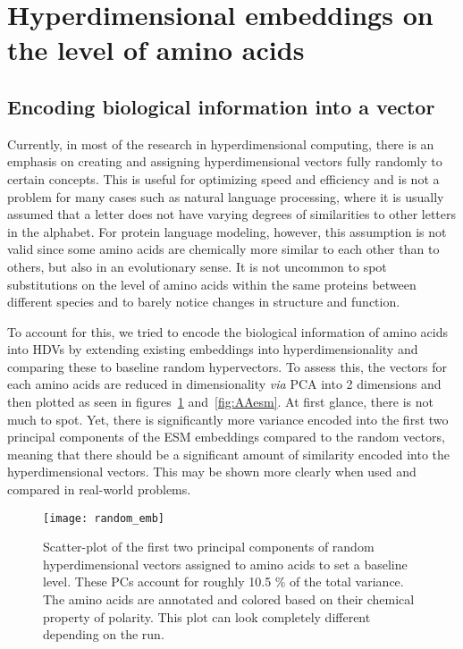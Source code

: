 \section{Hyperdimensional embeddings on the level of amino acids}
\subsection*{Encoding biological information into a vector}
Currently, in most of the research in hyperdimensional computing, there is an emphasis on creating and assigning hyperdimensional vectors fully randomly to certain concepts. This is useful for optimizing speed and efficiency and is not a problem for many cases such as natural language processing, where it is usually assumed that a letter does not have varying degrees of similarities to other letters in the alphabet. For protein language modeling, however, this assumption is not valid since some amino acids are chemically more similar to each other than to others, but also in an evolutionary sense. It is not uncommon to spot substitutions on the level of amino acids within the same proteins between different species and to barely notice changes in structure and function.

To account for this, we tried to encode the biological information of amino acids into HDVs by extending existing embeddings into hyperdimensionality and comparing these to baseline random hypervectors. To assess this, the vectors for each amino acids are reduced in dimensionality \textit{via} PCA into 2 dimensions and then plotted as seen in figures~\ref{fig:AArand} and~\ref{fig:AAesm}. At first glance, there is not much to spot. Yet, there is significantly more variance encoded into the first two principal components of the ESM embeddings compared to the random vectors, meaning that there should be a significant amount of similarity encoded into the hyperdimensional vectors. This may be shown more clearly when used and compared in real-world problems.
\begin{figure}[H]
    \centering
    \texttt{[image: random\_emb]}
    \caption{Scatter-plot of the first two principal components of random hyperdimensional vectors assigned to amino acids to set a baseline level. These PCs account for roughly 10.5 \% of the total variance. The amino acids are annotated and colored based on their chemical property of polarity. This plot can look completely different depending on the run.}\label{fig:AArand}
\end{figure}

